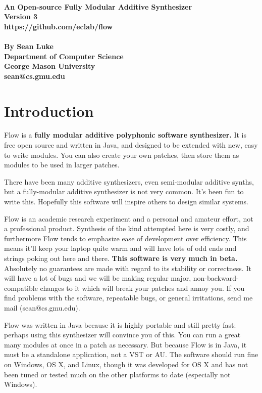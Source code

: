 \documentclass{article}
\newcommand\name{Flow}
\begin{document}
\noindent {\Huge\bf {\name}}\\[0.5em]
{\large \bf An Open-source Fully Modular Additive Synthesizer\\[0.2em]
Version 3\\[0.2em]
https://github.com/eclab/flow\\\\[0.2em]
By Sean Luke\\[0.2em]
Department of Computer Science\\[0.25em]
George Mason University\\[0.2em]
sean@cs.gmu.edu}

\vspace{1em}
\tableofcontents

\clearpage

\section{Introduction}

{\name} is a {\bf fully modular additive polyphonic software synthesizer.}  It is free open source and written in Java, and designed to be extended with new, easy to write modules.  You can also create your own patches, then store them as modules to be used in larger patches. 

There have been many additive synthesizers, even semi-modular additive synths, but a fully-modular additive synthesizer is not very common.   It's been fun to write this.  Hopefully this software will inspire others to design similar systems.

{\name} is an academic research experiment and a personal and amateur effort, not a professional product.  Synthesis of the kind attempted here is very costly, and furthermore {\name} tends to emphasize ease of development over efficiency.  This means it'll keep your laptop quite warm and will have lots of odd ends and strings poking out here and there.  {\bf This software is very much in beta.} Absolutely no guarantees are made with regard to its stability or correctness.  It will have a lot of bugs and we will be making regular major, non-backward-compatible changes to it which will break your patches and annoy you.  If you find problems with the software, repeatable bugs, or general irritations, send me mail (sean@cs.gmu.edu).

{\name} was written in Java because it is highly portable and still pretty fast: perhaps using this synthesizer will convince you of this.  You can run a great many modules at once in a patch as necessary.  But because {\name} is in Java, it must be a standalone application, not a VST or AU.  The software should run fine on Windows, OS X, and Linux, though it was developed for OS X and has not been tuned or tested much on the other platforms to date (especially not Windows).
\end{document}
